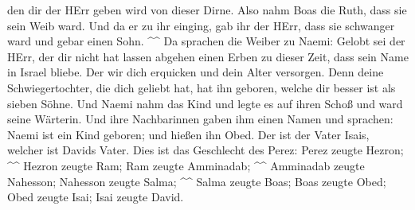 den dir der HErr geben wird von dieser Dirne.  Also nahm
Boas die Ruth, dass sie sein Weib ward. Und da er zu ihr einging, gab
ihr der HErr, dass sie schwanger ward und gebar einen Sohn. \^{}\^{}
 Da sprachen die Weiber zu Naemi: Gelobt sei der HErr,
der dir nicht hat lassen abgehen einen Erben zu dieser Zeit, dass sein
Name in Israel bliebe.  Der wir dich erquicken und dein
Alter versorgen. Denn deine Schwiegertochter, die dich geliebt hat, hat
ihn geboren, welche dir besser ist als sieben Söhne.  Und
Naemi nahm das Kind und legte es auf ihren Schoß und ward seine
Wärterin.  Und ihre Nachbarinnen gaben ihm einen Namen
und sprachen: Naemi ist ein Kind geboren; und hießen ihn Obed. Der ist
der Vater Isais, welcher ist Davids Vater.  Dies ist das
Geschlecht des Perez: Perez zeugte Hezron; \^{}\^{} 
Hezron zeugte Ram; Ram zeugte Amminadab; \^{}\^{} 
Amminadab zeugte Nahesson; Nahesson zeugte Salma; \^{}\^{}
 Salma zeugte Boas; Boas zeugte Obed; 
Obed zeugte Isai; Isai zeugte David.
